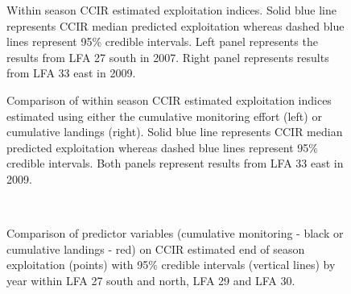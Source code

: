 \begin{figure}
\centering
             \caption{Within season CCIR estimated exploitation indices. Solid blue line represents CCIR median predicted exploitation whereas dashed blue lines represent 95\% credible intervals. Left panel represents the results from LFA 27 south in 2007. Right panel represents results from LFA 33 east in 2009.}
\end{figure}

\begin{figure}
\centering
             \caption{Comparison of within season CCIR estimated exploitation indices estimated using either the cumulative monitoring effort (left) or cumulative landings (right). Solid blue line represents CCIR median predicted exploitation whereas dashed blue lines represent 95\% credible intervals. Both panels represent results from LFA 33 east in 2009.}
\end{figure}




\begin{figure}
        \centering
         \\
                 \caption{Comparison of predictor variables (cumulative monitoring - black or cumulative landings - red) on CCIR estimated end of season exploitation (points) with 95\% credible intervals (vertical lines) by year within LFA 27 south and north, LFA 29 and LFA 30.}
        \end{figure}

